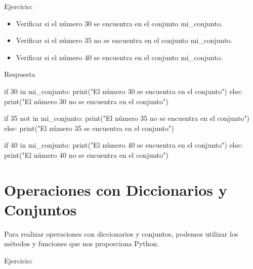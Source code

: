 \documentclass[
  a4paper,
  DIV=11,
  numbers=noendperiod,
  onepage,
  openany]{scrreprt}
\newenvironment{Shaded}{\begin{snugshade}}{\end{snugshade}}
\newcommand{\BuiltInTok}[1]{\textcolor[rgb]{0.00,0.23,0.31}{#1}}
\newcommand{\ControlFlowTok}[1]{\textcolor[rgb]{0.00,0.23,0.31}{#1}}
\newcommand{\DecValTok}[1]{\textcolor[rgb]{0.68,0.00,0.00}{#1}}
\newcommand{\KeywordTok}[1]{\textcolor[rgb]{0.00,0.23,0.31}{#1}}
\newcommand{\NormalTok}[1]{\textcolor[rgb]{0.00,0.23,0.31}{#1}}
\newcommand{\StringTok}[1]{\textcolor[rgb]{0.13,0.47,0.30}{#1}}
\providecommand{\tightlist}{%
  \setlength{\itemsep}{0pt}\setlength{\parskip}{0pt}}\usepackage{longtable,booktabs,array}
\begin{document}
Ejercicio:

\begin{itemize}
\tightlist
\item
  Verificar si el número 30 se encuentra en el conjunto mi\_conjunto.
\item
  Verificar si el número 35 no se encuentra en el conjunto mi\_conjunto.
\item
  Verificar si el número 40 se encuentra en el conjunto mi\_conjunto.
\end{itemize}

Respuesta

\begin{Shaded}
\begin{Highlighting}[]
\ControlFlowTok{if} \DecValTok{30} \KeywordTok{in}\NormalTok{ mi\_conjunto:}
    \BuiltInTok{print}\NormalTok{(}\StringTok{"El número 30 se encuentra en el conjunto"}\NormalTok{)}
\ControlFlowTok{else}\NormalTok{:}
    \BuiltInTok{print}\NormalTok{(}\StringTok{"El número 30 no se encuentra en el conjunto"}\NormalTok{)}

\ControlFlowTok{if} \DecValTok{35} \KeywordTok{not} \KeywordTok{in}\NormalTok{ mi\_conjunto:}
    \BuiltInTok{print}\NormalTok{(}\StringTok{"El número 35 no se encuentra en el conjunto"}\NormalTok{)}
\ControlFlowTok{else}\NormalTok{:}
    \BuiltInTok{print}\NormalTok{(}\StringTok{"El número 35 se encuentra en el conjunto"}\NormalTok{)}

\ControlFlowTok{if} \DecValTok{40} \KeywordTok{in}\NormalTok{ mi\_conjunto:}
    \BuiltInTok{print}\NormalTok{(}\StringTok{"El número 40 se encuentra en el conjunto"}\NormalTok{)}
\ControlFlowTok{else}\NormalTok{:}
    \BuiltInTok{print}\NormalTok{(}\StringTok{"El número 40 no se encuentra en el conjunto"}\NormalTok{)}
\end{Highlighting}
\end{Shaded}

\chapter{Operaciones con Diccionarios y
Conjuntos}\label{operaciones-con-diccionarios-y-conjuntos}

Para realizar operaciones con diccionarios y conjuntos, podemos utilizar
los métodos y funciones que nos proporciona Python.

Ejercicio:
\end{document}

